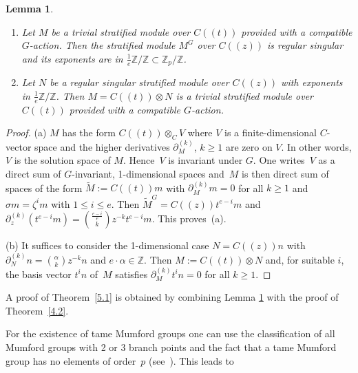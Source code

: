 \documentclass[10pt,a4paper]{amsart}
\numberwithin{equation}{section}
\newtheorem{Lemma}[Theorem]{Lemma}
\begin{document}
 \begin{Lemma}\label{5.2}\samepage\quad
\begin{enumerate}\itemsep=0pt
\item[$(a)$] Let $M$ be a trivial stratified module over $C((t))$ provided with a compatible $G$-action. Then the stratified module $M^G$ over $C((z))$ is regular singular and its exponents are in $\frac{1}{e}\mathbb{Z}/\mathbb{Z}\subset \mathbb{Z}_p/\mathbb{Z}$.
\item[$(b)$]Let $N$ be a regular singular stratified module over $C((z))$ with exponents in $\frac{1}{e}\mathbb{Z}/\mathbb{Z}$. Then $M=C((t))\otimes N$ is a trivial stratified module over $C((t))$ provided with a compatible $G$-action.
\end{enumerate}
 \end{Lemma}
\begin{proof} (a) $M$ has the form $C((t))\otimes _CV$ where $V$ is a finite-dimensional $C$-vector space and the higher derivatives $\partial _M^{(k)}$, $k\geq 1$ are zero on $V$. In other words, $V$ is the solution space of $M$. Hence~$V$ is invariant under $G$. One writes~$V$ as a direct sum of $G$-invariant, 1-dimensional spaces and~$M$ is then direct sum of spaces of the form $\tilde{M}:=C((t))m$ with $\partial _M^{(k)}m=0$ for all $k\geq 1$ and $\sigma m=\zeta ^im$ with $1\leq i \leq e$. Then $\tilde{M}^G=C((z))t^{e-i}m$ and $\partial _z^{(k)}(t^{e-i}m)={\frac{e-i}{e}\choose k }z^{-k}t^{e-i}m$. This proves~(a).

(b) It suffices to consider the 1-dimensional case $N=C((z))n$ with $\partial_N^{(k)}n={\alpha \choose k }z^{-k}n$ and $e\cdot \alpha \in \mathbb{Z}$. Then $M:=C((t))\otimes N$ and, for suitable $i$, the basis vector $t^in$ of~$M$ satisfies $\partial_M^{(k)} t^in=0$ for all $k\geq 1$. \end{proof}

A proof of Theorem~\ref{5.1} is obtained by combining Lemma \ref{5.2} with the proof of Theorem~\ref{4.2}.

For the existence of tame Mumford groups one can use the classification of all Mumford groups with 2 or 3 branch points and the fact that a tame Mumford group has no elements of order~$p$ (see~\cite{Vo-vdP}). This leads to
\end{document}
